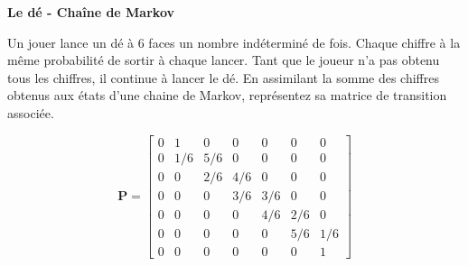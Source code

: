 \begin{Exercice}[10 minutes]\textbf{Le dé - Chaîne de Markov \optionnel}

Un jouer lance un dé à 6 faces un nombre indéterminé de fois. Chaque chiffre à la même probabilité de sortir à chaque lancer. Tant que le joueur n'a pas obtenu tous les chiffres, il continue à lancer le dé. En assimilant la somme des chiffres obtenus aux états d'une chaine de Markov, représentez sa matrice de transition associée.

	 \begin{solution}

	\[ 
		\mathbf{P} =
		\begin{bmatrix}
		0 & 1 & 0 & 0 & 0 & 0 & 0  \\
		0 & 1/6 & 5/6 & 0 & 0 & 0 & 0  \\
		0 & 0 & 2/6 & 4/6 & 0 & 0 & 0  \\
		0 & 0 & 0 & 3/6 & 3/6 & 0 & 0  \\
		0 & 0 & 0 & 0 & 4/6 & 2/6 & 0  \\
		0 & 0 & 0 & 0 & 0 & 5/6 & 1/6  \\
		0 & 0 & 0 & 0 & 0 & 0 & 1 
		\end{bmatrix}
	\]
	 \end{solution}
\end{Exercice}

